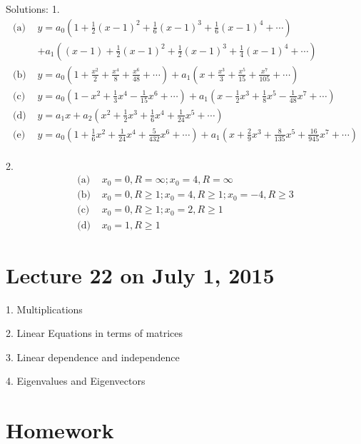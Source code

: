 \documentclass[11pt]{article}
\begin{document}
Solutions:
1. 
$$
\begin{aligned}
\text{(a)  }& y = a_0 \left(1 + \frac 1 2 (x-1)^2 + \frac 1 6 (x-1)^3 + \frac 1 6 (x-1)^4 + \cdots\right) \\
& + a_1 \left((x-1) + \frac 1 2(x-1)^2 +\frac 1 2(x-1)^3 +\frac 1 4(x-1)^4+\cdots \right)\\
\text{(b)  }& y = a_0 \left(1 + \frac {x^2} 2 + \frac{x^4}{8} + \frac {x^6}{48}+\cdots\right) + a_1 \left(x + \frac{x^3}{3} + \frac{x^5}{15} + \frac{x^7}{105}+ \cdots\right)\\
\text{(c)  }& y = a_0 \left(1 - x^2 + \frac 1 3 x^4 - \frac 1 {15} x^6+\cdots\right)+a_1\left( x - \frac 1 2 x^3 + \frac 1 8 x^5 -\frac 1 {48}x^7 + \cdots\right)\\
\text{(d)  }& y = a_1 x + a_2 \left(x^2 + \frac 1 2 x^3 + \frac 1 6 x^4 + \frac 1 {24}x^5 + \cdots\right)\\
\text{(e)  }& y = a_0 \left(1 + \frac 1 6 x^2 + \frac 1 {24} x^4 + \frac 5{432}x^6 + \cdots\right)+a_1\left(x + \frac 2 9 x^3 + \frac 8 {135}x^5 + \frac{16}{945}x^7 + \cdots\right)\\
\end{aligned}
$$

2. 
$$
\begin{aligned}
\text{(a)  }& x_0 = 0, R = \infty; x_0 = 4, R = \infty\\
\text{(b)  }& x_0 = 0, R \geq 1; x_0 = 4, R \geq 1; x_0 = -4, R \geq 3\\
\text{(c)  }& x_0 = 0, R \geq 1; x_0 = 2, R\geq 1\\
\text{(d)  }& x_0 = 1, R \geq 1
\end{aligned}
$$


\newpage
\section{Lecture 22 on July 1, 2015}

1. Multiplications

2. Linear Equations in terms of matrices

3. Linear dependence and independence

4. Eigenvalues and Eigenvectors

\newpage

\section*{Homework}
\end{document}
